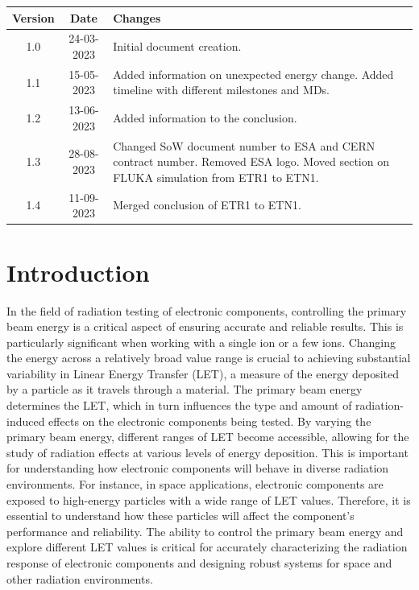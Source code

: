 \documentclass{cernatsnote}
\begin{document}
\noindent
\begin{tabularx}{\textwidth}{|c|c|X|}
\hline
\textbf{Version} & \textbf{Date} & \textbf{Changes} \\
\hline
1.0 & 24-03-2023 & Initial document creation. \\
\hline
1.1 & 15-05-2023 &  Added information on unexpected energy change. Added timeline with different milestones and MDs.\\
\hline
1.2 & 13-06-2023 & Added information to the conclusion. \\
\hline
1.3 & 28-08-2023 & Changed SoW document number to ESA and CERN contract number. Removed ESA logo. Moved section on FLUKA simulation from ETR1 to ETN1.\\
\hline
1.4 & 11-09-2023 & Merged conclusion of ETR1 to ETN1.\\
\hline
\end{tabularx}

\newpage

\section{Introduction}
In the field of radiation testing of electronic components, controlling the primary beam energy is a critical aspect of ensuring accurate and reliable results. This is particularly significant when working with a single ion or a few ions. Changing the energy across a relatively broad value range is crucial to achieving substantial variability in Linear Energy Transfer (LET), a measure of the energy deposited by a particle as it travels through a material. The primary beam energy determines the LET, which in turn influences the type and amount of radiation-induced effects on the electronic components being tested. By varying the primary beam energy, different ranges of LET become accessible, allowing for the study of radiation effects at various levels of energy deposition. This is important for understanding how electronic components will behave in diverse radiation environments. For instance, in space applications, electronic components are exposed to high-energy particles with a wide range of LET values. Therefore, it is essential to understand how these particles will affect the component's performance and reliability. The ability to control the primary beam energy and explore different LET values is critical for accurately characterizing the radiation response of electronic components and designing robust systems for space and other radiation environments.
\end{document}
